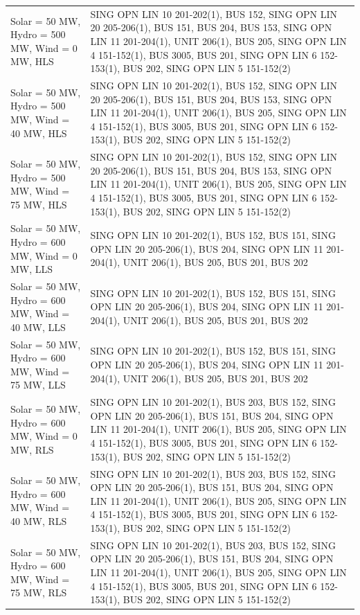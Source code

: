 \documentclass[10pt]{report}
\begin{document}
\begin{table}[H]
{\begin{tabular}{lp{17cm}}
Solar = 50 MW, Hydro = 500 MW, Wind = 0 MW, HLS & SING OPN LIN   10 201-202(1), BUS 152, SING OPN LIN   20 205-206(1), BUS 151, BUS 204, BUS 153, SING OPN LIN   11 201-204(1), UNIT 206(1), BUS 205, SING OPN LIN   4 151-152(1), BUS 3005, BUS 201, SING OPN LIN   6 152-153(1), BUS 202, SING OPN LIN   5 151-152(2) \\
Solar = 50 MW, Hydro = 500 MW, Wind = 40 MW, HLS & SING OPN LIN   10 201-202(1), BUS 152, SING OPN LIN   20 205-206(1), BUS 151, BUS 204, BUS 153, SING OPN LIN   11 201-204(1), UNIT 206(1), BUS 205, SING OPN LIN   4 151-152(1), BUS 3005, BUS 201, SING OPN LIN   6 152-153(1), BUS 202, SING OPN LIN   5 151-152(2) \\
Solar = 50 MW, Hydro = 500 MW, Wind = 75 MW, HLS & SING OPN LIN   10 201-202(1), BUS 152, SING OPN LIN   20 205-206(1), BUS 151, BUS 204, BUS 153, SING OPN LIN   11 201-204(1), UNIT 206(1), BUS 205, SING OPN LIN   4 151-152(1), BUS 3005, BUS 201, SING OPN LIN   6 152-153(1), BUS 202, SING OPN LIN   5 151-152(2) \\
Solar = 50 MW, Hydro = 600 MW, Wind = 0 MW, LLS & SING OPN LIN   10 201-202(1), BUS 152, BUS 151, SING OPN LIN   20 205-206(1), BUS 204, SING OPN LIN   11 201-204(1), UNIT 206(1), BUS 205, BUS 201, BUS 202 \\
Solar = 50 MW, Hydro = 600 MW, Wind = 40 MW, LLS & SING OPN LIN   10 201-202(1), BUS 152, BUS 151, SING OPN LIN   20 205-206(1), BUS 204, SING OPN LIN   11 201-204(1), UNIT 206(1), BUS 205, BUS 201, BUS 202 \\
Solar = 50 MW, Hydro = 600 MW, Wind = 75 MW, LLS & SING OPN LIN   10 201-202(1), BUS 152, BUS 151, SING OPN LIN   20 205-206(1), BUS 204, SING OPN LIN   11 201-204(1), UNIT 206(1), BUS 205, BUS 201, BUS 202 \\
Solar = 50 MW, Hydro = 600 MW, Wind = 0 MW, RLS & SING OPN LIN   10 201-202(1), BUS 203, BUS 152, SING OPN LIN   20 205-206(1), BUS 151, BUS 204, SING OPN LIN   11 201-204(1), UNIT 206(1), BUS 205, SING OPN LIN   4 151-152(1), BUS 3005, BUS 201, SING OPN LIN   6 152-153(1), BUS 202, SING OPN LIN   5 151-152(2) \\
Solar = 50 MW, Hydro = 600 MW, Wind = 40 MW, RLS & SING OPN LIN   10 201-202(1), BUS 203, BUS 152, SING OPN LIN   20 205-206(1), BUS 151, BUS 204, SING OPN LIN   11 201-204(1), UNIT 206(1), BUS 205, SING OPN LIN   4 151-152(1), BUS 3005, BUS 201, SING OPN LIN   6 152-153(1), BUS 202, SING OPN LIN   5 151-152(2) \\
Solar = 50 MW, Hydro = 600 MW, Wind = 75 MW, RLS & SING OPN LIN   10 201-202(1), BUS 203, BUS 152, SING OPN LIN   20 205-206(1), BUS 151, BUS 204, SING OPN LIN   11 201-204(1), UNIT 206(1), BUS 205, SING OPN LIN   4 151-152(1), BUS 3005, BUS 201, SING OPN LIN   6 152-153(1), BUS 202, SING OPN LIN   5 151-152(2) \\

\end{tabular}}
\end{table}
\end{document}
